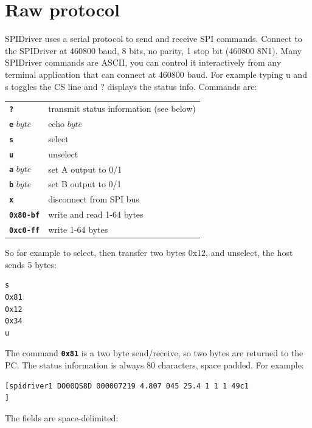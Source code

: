 \documentclass{article}
\newcommand{\mach}[1]{\texttt{\textbf{#1}}}
\newcommand{\gap}{\vspace{10pt}}
\begin{document}
\newpage
\section{Raw protocol}

SPIDriver uses a serial protocol to send and receive SPI commands.
Connect to the SPIDriver at 460800 baud, 8 bits, no parity, 1 stop bit (460800 8N1).
Many SPIDriver commands are ASCII, you can control it
interactively from any terminal application that can connect at 460800
baud. For example typing u and s toggles the CS line and ? displays the
status info.
Commands are:

\gap\begin{tabular}{ll}
\hline
\mach{?}        & transmit status information (see below)        \\
\mach{e} $byte$ & echo $byte$       \\
\mach{s}        & select        \\
\mach{u}        & unselect        \\
\mach{a} $byte$ & set A output to 0/1       \\
\mach{b} $byte$ & set B output to 0/1       \\
\mach{x}        & disconnect from SPI bus       \\
\mach{0x80-bf}  & write and read 1-64 bytes       \\
\mach{0xc0-ff}  & write 1-64 bytes        \\ \hline
\end{tabular}\gap

So for example to select, then transfer two bytes 0x12, and unselect, the host sends 5 bytes:

\begin{lstlisting}
s
0x81
0x12
0x34
u
\end{lstlisting}

The command \mach{0x81} is a two byte send/receive, so two bytes are returned to the PC.
The status information is always 80 characters, space padded. For example:

{\scriptsize
\begin{framed}\begin{Verbatim}
[spidriver1 DO00QS8D 000007219 4.807 045 25.4 1 1 1 49c1                       ]
\end{Verbatim}
\end{framed}}

The fields are space-delimited:
\end{document}
